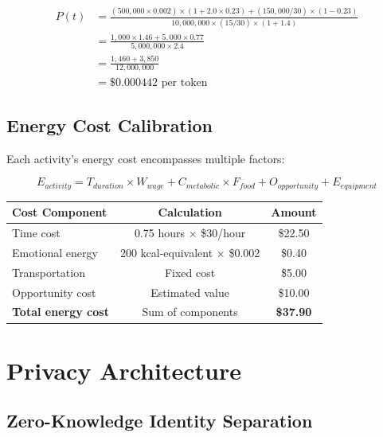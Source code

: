 \documentclass[11pt,letterpaper]{article}
\begin{document}
\begin{align}
P(t) &= \frac{(500,000 \times 0.002) \times (1 + 2.0 \times 0.23) + (150,000/30) \times (1 - 0.23)}{10,000,000 \times (15/30) \times (1 + 1.4)} \\
&= \frac{1,000 \times 1.46 + 5,000 \times 0.77}{5,000,000 \times 2.4} \\
&= \frac{1,460 + 3,850}{12,000,000} \\
&= \$0.000442 \text{ per token}
\end{align}

\subsection{Energy Cost Calibration}

Each activity's energy cost encompasses multiple factors:

\begin{equation}
E_{activity} = T_{duration} \times W_{wage} + C_{metabolic} \times F_{food} + O_{opportunity} + E_{equipment}
\end{equation}


\begin{table}[H]
\centering
\begin{tabular}{lcc}
\toprule
\textbf{Cost Component} & \textbf{Calculation} & \textbf{Amount} \\
\midrule
Time cost & 0.75 hours × \$30/hour & \$22.50 \\
Emotional energy & 200 kcal-equivalent × \$0.002 & \$0.40 \\
Transportation & Fixed cost & \$5.00 \\
Opportunity cost & Estimated value & \$10.00 \\
\midrule
\textbf{Total energy cost} & Sum of components & \textbf{\$37.90} \\
\bottomrule
\end{tabular}
\end{table}


\section{Privacy Architecture}

\subsection{Zero-Knowledge Identity Separation}
\end{document}
